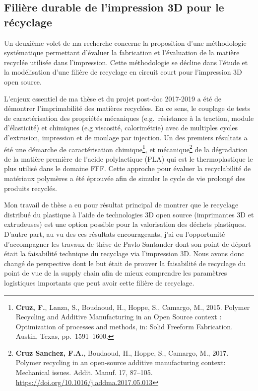 \documentclass[
  12pt,
  oneside]{book}
\begin{document}
\hypertarget{filiuxe8re-durable-de-limpression-3d-pour-le-ruxe9cyclage}{%
\subsection{Filière durable de l'impression 3D pour le récyclage}\label{filiuxe8re-durable-de-limpression-3d-pour-le-ruxe9cyclage}}

Un deuxième volet de ma recherche concerne la proposition d'une méthodologie systématique permettant d'évaluer la fabrication et l'évaluation de la matière recyclée utilisée dans l'impression. Cette méthodologie se décline dans l'étude et la modélisation d'une filière de recyclage en circuit court pour l'impression 3D open source.

L'enjeux essentiel de ma thèse et du projet post-doc 2017-2019 a été de démontrer l'imprimabilité des matières recyclées.
En ce sens, le couplage de tests de caractérisation des propriétés mécaniques (e.g.~résistance à la traction, module d'élasticité) et chimiques (e.g viscosité, calorimétrie) avec de multiples cycles d'extrusion, impression et de moulage par injection. Un des premiers résultats a été une démarche de caractérisation chimique\footnote{\textbf{Cruz, F.}, Lanza, S., Boudaoud, H., Hoppe, S., Camargo, M., 2015. Polymer Recycling and Additive Manufacturing in an Open Source context : Optimization of processes and methods, in: Solid Freeform Fabrication. Austin, Texas, pp.~1591--1600.}, et mécanique\footnote{\textbf{Cruz Sanchez, F.A.}, Boudaoud, H., Hoppe, S., Camargo, M., 2017. Polymer recycling in an open-source additive manufacturing context: Mechanical issues. Addit. Manuf. 17, 87--105. \url{https://doi.org/10.1016/j.addma.2017.05.013}} de la dégradation de la matière première de l'acide polylactique (PLA) qui est le thermoplastique le plus utilisé dans le domaine FFF. Cette approche pour évaluer la recyclabilité de matériaux polymères a été éprouvée afin de simuler le cycle de vie prolongé des produits recyclés.

Mon travail de thèse a eu pour résultat principal de montrer que le recyclage distribué du plastique à l'aide de technologies 3D open source (imprimantes 3D et extrudeuses) est une option possible pour la valorisation des déchets plastiques.
D'autre part, au vu des ces résultats encourageants, j'ai eu l'opportunité d'accompagner les travaux de thèse de Pavlo Santander dont son point de départ était la faisabilité technique du recyclage via l'impression 3D. Nous avons donc changé de perspective dont le but était de prouver la faisabilité de recyclage du point de vue de la supply chain afin de mieux comprendre les paramètres logistiques importants que peut avoir cette filière de recyclage.
\end{document}
